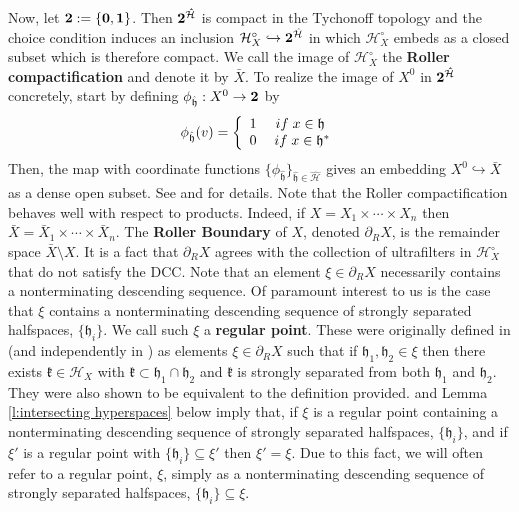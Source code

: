 \documentclass{amsart}
\theoremstyle{definition}
\newtheorem*{Notation warning}{Warning on notations}
\newtheorem*{Sketch of proof}{Sketch of proof for Theorem C}
\newcommand{\h}{{\mathfrak h}}
\newcommand{\hh}{\hat{\mathfrak h}}
\begin{document}
\begin{sloppypar}
Now, let $\bf{2}:=\{0,1\}$. Then $\bf{2}^{\hat{\mathcal{H}}}$ is compact in the Tychonoff topology and the choice condition induces an inclusion $\mathcal{H}_X^\circ\hookrightarrow{\bf2}^{\hat{\mathcal{H}}}$ in which $\mathcal{H}_X^\circ$ embeds as a closed subset which is therefore compact. We call the image of $\mathcal{H}_X^\circ$ the {\bf Roller compactification} and denote it by $\bar{X}$. To realize the image of $X^0$ in $\bf{2}^{\hat{\mathcal{H}}}$ concretely, start by defining $\phi_{\hh}:X^0\to\bf{2}$ by
\[
    \phi_{\hh}(v)=\left\{\begin{array}{cc}
        1 & {\rm if}\;x\in\h \\
        0 & \;{\rm if}\;x\in\h^*
    \end{array}\right.
\]
Then, the map with coordinate functions $\{\phi_{\hh}\}_{\hh\in\hat{\mathcal{H}}}$ gives an embedding $X^0\hookrightarrow\bar{X}$ as a dense open subset. See \cite{Roller2016PocSM} and
\cite{NV_PoissonBdry} for details. Note that the Roller compactification behaves well with respect to products. Indeed, if $X=X_1\times\cdots\times X_n$ then $\bar{X}=\bar{X}_1\times\cdots\times\bar{X}_n$. 
\medskip
The {\bf Roller Boundary} of $X$, denoted $\partial_RX$, is the remainder space $\bar{X}\setminus X$. It is a fact that $\partial_RX$ agrees with the collection of ultrafilters in $\mathcal{H}_X^\circ$ that do not satisfy the DCC. Note that an element $\xi\in\partial_RX$ necessarily contains a nonterminating descending sequence. Of paramount interest to us is the case that $\xi$ contains a nonterminating descending sequence of strongly separated halfspaces, $\{\h_i\}$. We call such $\xi$ a {\bf regular point}. These were originally defined in \cite{FERNÓS_2018} (and independently in \cite{kar2016ping}) as elements $\xi\in\partial_RX$ such that if $\h_1,\h_2\in\xi$ then there exists $\mathfrak{k}\in\mathcal{H}_X$ with $\mathfrak{k}\subset\h_1\cap\h_2$ and $\mathfrak{k}$ is strongly separated from both $\h_1$ and $\h_2$. They were also shown to be equivalent to the definition provided. \cite[Proposition 5.13]{Fernos2016Random} and Lemma \ref{l:intersecting hyperspaces} below imply that, if $\xi$ is a regular point containing a nonterminating descending sequence of strongly separated halfspaces, $\{\h_i\}$, and if $\xi'$ is a regular point with $\{\h_i\} \subseteq\xi'$ then $\xi'=\xi$. Due to this fact, we will often refer to a regular point, $\xi$, simply as a nonterminating descending sequence of strongly separated halfspaces, $\{\h_i\} \subseteq\xi$.
\medskip


\end{sloppypar}
\end{document}
